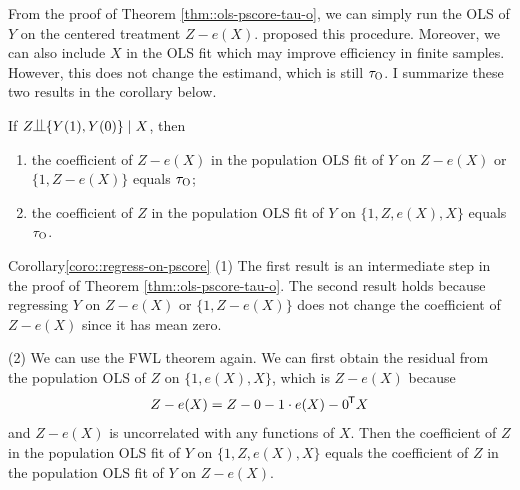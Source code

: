  
 From the proof of Theorem \ref{thm::ols-pscore-tau-o}, we can simply run the OLS of $Y$ on the centered treatment $ Z-e(X)$. \citet{lee2018simple} proposed this procedure. Moreover, we can also include $X$ in the OLS fit which may improve efficiency in finite samples. However, this does not change the estimand, which is still $\tau_\textsc{O}$. I summarize these two results in the corollary below.
 
 \begin{corollary}\label{coro::regress-on-pscore}
If $Z\ind \{  Y(1), Y(0) \} \mid X$, then 
 \begin{enumerate}
 \item[(1)]
 the coefficient of $Z-e(X)$ in the population OLS fit of $Y$ on $Z-e(X)$ or $\{1, Z-e(X) \}$ equals $\tau_\textsc{O}$;
 \item[(2)]
 the coefficient of $Z$ in the population OLS fit of $Y$ on $\{1, Z, e(X), X\}$ equals $\tau_\textsc{O}$. 
 \end{enumerate}
 \end{corollary}
 
 
 
\begin{myproof}{Corollary}{\ref{coro::regress-on-pscore}}
(1) The first result is an intermediate step in the proof of Theorem \ref{thm::ols-pscore-tau-o}. The second result holds because regressing  $Y$ on $Z-e(X)$ or $\{1, Z-e(X) \}$ does not change the coefficient of $Z-e(X) $ since it has mean zero. 


(2) We can use the FWL theorem again. We can first obtain the residual from the population OLS of $Z$ on $\{1, e(X), X\}$, which is $Z-e(X) $ because 
$$
Z-e(X) = Z-0 - 1\cdot e(X) - 0^{\mkern-1.5mu\mathsf{T}} X $$ 
and $Z-e(X)$ is uncorrelated with any functions of $X$. 
Then the coefficient of $Z$ in the population OLS fit of $Y$ on $\{1, Z, e(X), X\}$ equals the coefficient of $Z$ in the population OLS fit of $Y$  on $Z-e(X)$. 
  \end{myproof}
  
  
  
